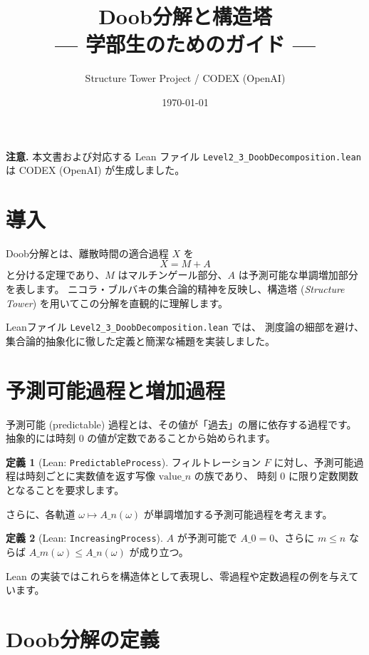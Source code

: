 \documentclass[12pt]{ltjsarticle}
\title{Doob分解と構造塔\\{\large --- 学部生のためのガイド ---}}
\author{Structure Tower Project / CODEX (OpenAI)}
\date{\today}
\theoremstyle{definition}
\newtheorem{definition}{定義}[section]
\theoremstyle{plain}
\begin{document}
\maketitle
\tableofcontents

\bigskip
\begin{center}
  \textbf{注意.} 本文書および対応する Lean ファイル
  \texttt{Level2\_3\_DoobDecomposition.lean} は CODEX (OpenAI) が生成しました。
\end{center}

\section{導入}

Doob分解とは、離散時間の適合過程 $X$ を
\[
  X = M + A
\]
と分ける定理であり、$M$ はマルチンゲール部分、$A$ は予測可能な単調増加部分を表します。
ニコラ・ブルバキの集合論的精神を反映し、構造塔 (\emph{Structure Tower})
を用いてこの分解を直観的に理解します。

Leanファイル \texttt{Level2\_3\_DoobDecomposition.lean} では、
測度論の細部を避け、集合論的抽象化に徹した定義と簡潔な補題を実装しました。

\section{予測可能過程と増加過程}

予測可能 (predictable) 過程とは、その値が「過去」の層に依存する過程です。
抽象的には時刻 0 の値が定数であることから始められます。

\begin{definition}[Lean: \texttt{PredictableProcess}]
フィルトレーション $F$ に対し、予測可能過程は時刻ごとに実数値を返す写像 $\mathrm{value}\_n$ の族であり、
時刻 0 に限り定数関数となることを要求します。
\end{definition}

さらに、各軌道 $\omega \mapsto A\_n(\omega)$ が単調増加する予測可能過程を考えます。

\begin{definition}[Lean: \texttt{IncreasingProcess}]
$A$ が予測可能で $A\_0=0$、さらに $m\le n$ ならば $A\_m(\omega)\le A\_n(\omega)$ が成り立つ。
\end{definition}

Lean の実装ではこれらを構造体として表現し、零過程や定数過程の例を与えています。

\section{Doob分解の定義}
\end{document}

